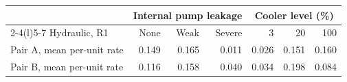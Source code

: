 \par\medskip
\begin{tabular}{@{}l rrr rrr@{}}
\toprule
& \multicolumn{3}{c}{Internal pump leakage} & \multicolumn{3}{c}{Cooler level (\%)} \\
\cmidrule(lr){2-4}\cmidrule(l){5-7}
Hydraulic, R1 & None & Weak & Severe & 3 & 20 & 100 \\
\midrule
Pair A, mean per-unit rate & 0.149 & 0.165 & 0.011 & 0.026 & 0.151 & 0.160 \\
Pair B, mean per-unit rate & 0.116 & 0.158 & 0.040 & 0.034 & 0.198 & 0.084 \\
\bottomrule
\end{tabular}
